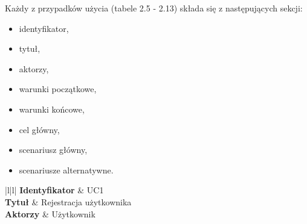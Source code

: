 Każdy z przypadków użycia (tabele 2.5 - 2.13) składa się z następujących sekcji:

\begin{itemize}
\item identyfikator,
\item tytuł,
\item aktorzy,
\item warunki początkowe,
\item warunki końcowe,
\item cel główny,
\item scenariusz główny,
\item scenariusze alternatywne.
\end{itemize}

\begin{table}[H]
\centering
\begin{tabular}{|l|l|}
	\hline
	\textbf{Identyfikator}                                                                                                                                                                                                                	& UC1                                                                                                                                                                                                                                   	\\ \hline
	\textbf{Tytuł}                                                                                                                                                                                                                        	& Rejestracja użytkownika                                                                                                                                                                                                               	\\ \hline
	\textbf{Aktorzy}                                                                                                                                                                                                                      	& Użytkownik                                                                                                                                                                                                                            	\\ \hline
	                                                                                                                                                                                                                                                                                                                             	\\ \hline

\end{tabular}
\end{table}
